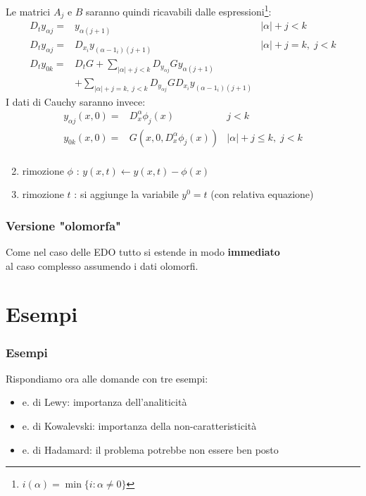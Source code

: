 \documentclass[serif,notheorems]{beamer}
\theoremstyle{definition} %
\theoremstyle{remark}
\begin{document}
\begin{frame}
Le matrici $A_j$ e $B$ saranno quindi ricavabili dalle espressioni\footnote{$i(\alpha)=\min\{ i:\alpha\neq 0 \} $}:
\begin{align*}
D_t y_{\alpha j} =& y_{\alpha (j+1)} & |\alpha| + j < k \\
D_t y_{\alpha j} =& D_{x_i} y_{(\alpha-1_i)(j+1)} & |\alpha| + j = k, \; j < k\\
D_t y_{0k} =& D_tG + \sum_{|\alpha|+j < k} D_{y_{\alpha j}}G y_{\alpha (j+1)} \\
& + \sum_{|\alpha|+j = k, \; j < k} D_{y_{\alpha j}} G D_{x_i} y_{(\alpha-1_i)(j+1)}
\end{align*}
I dati di Cauchy saranno invece:
\begin{align*}
y_{\alpha j}(x, 0) = & D_x^{\alpha} \phi_j(x) & j < k\\
y_{0k}(x, 0) = & G\left( x, 0, D_x^{\alpha} \phi_j(x) \right) & \lvert \alpha \rvert + j \leq k, \; j < k\\
\end{align*}
\end{frame}

\begin{frame}
\begin{enumerate}
\setcounter{enumi}{1}
\item rimozione $\phi$ : $y(x,t)\leftarrow y(x,t)-\phi (x)$
\item rimozione $t$ : si aggiunge la variabile $y^0=t$ (con relativa equazione)
\end{enumerate}
\end{frame}

\begin{frame}
\frametitle{Versione "olomorfa"}
\begin{center}
Come nel caso delle EDO tutto si estende in modo \textbf{immediato} \\
al caso complesso assumendo i dati olomorfi.
\end{center}
\end{frame}

\section{Esempi}

\begin{frame}
\frametitle{Esempi}
Rispondiamo ora alle domande con tre esempi:
\begin{itemize}
\item e. di Lewy: importanza dell'analiticità
\item e. di Kowalevski: importanza della non-caratteristicità
\item e. di Hadamard: il problema potrebbe non essere ben posto
\end{itemize}
\end{frame}
\end{document}
